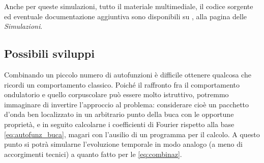 Anche per queste simulazioni, tutto il materiale multimediale,
il codice sorgente ed eventuale documentazione aggiuntiva
sono disponibili su \cite{PQ-QP}, alla pagina delle
\emph{Simulazioni}.

\subsection{Possibili sviluppi} \label{subsec:buca2d_sviluppi}

Combinando un piccolo numero di autofunzioni è difficile
ottenere qualcosa che ricordi un comportamento classico.
Poiché il raffronto fra il comportamento ondulatorio e quello
corpuscolare può essere molto istruttivo, potremmo
immaginare di invertire l'approccio al problema: considerare
cioè un pacchetto d'onda ben localizzato in un arbitrario
punto della buca con le opportune proprietà, e in seguito
calcolarne i coefficienti di Fourier rispetto alla 
base \eqref{eq:autofunz_buca}, magari con l'ausilio
di un programma per il calcolo. A questo punto si potrà
simularne l'evoluzione temporale in modo analogo 
(a meno di accorgimenti tecnici) a quanto fatto per le 
\eqref{eq:combinaz}.

